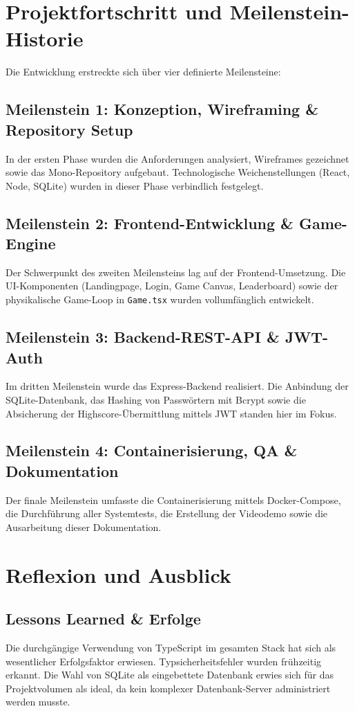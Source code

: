 \documentclass[12pt,a4paper]{article}
\begin{document}
\section{Projektfortschritt und Meilenstein-Historie}

Die Entwicklung erstreckte sich über vier definierte Meilensteine:

\subsection{Meilenstein 1: Konzeption, Wireframing \& Repository Setup}
In der ersten Phase wurden die Anforderungen analysiert, Wireframes gezeichnet sowie das Mono-Repository aufgebaut. Technologische Weichenstellungen (React, Node, SQLite) wurden in dieser Phase verbindlich festgelegt.

\subsection{Meilenstein 2: Frontend-Entwicklung \& Game-Engine}
Der Schwerpunkt des zweiten Meilensteins lag auf der Frontend-Umsetzung. Die UI-Komponenten (Landingpage, Login, Game Canvas, Leaderboard) sowie der physikalische Game-Loop in \texttt{Game.tsx} wurden vollumfänglich entwickelt.

\subsection{Meilenstein 3: Backend-REST-API \& JWT-Auth}
Im dritten Meilenstein wurde das Express-Backend realisiert. Die Anbindung der SQLite-Datenbank, das Hashing von Passwörtern mit Bcrypt sowie die Absicherung der Highscore-Übermittlung mittels JWT standen hier im Fokus.

\subsection{Meilenstein 4: Containerisierung, QA \& Dokumentation}
Der finale Meilenstein umfasste die Containerisierung mittels Docker-Compose, die Durchführung aller Systemtests, die Erstellung der Videodemo sowie die Ausarbeitung dieser Dokumentation.

\section{Reflexion und Ausblick}

\subsection{Lessons Learned \& Erfolge}
Die durchgängige Verwendung von TypeScript im gesamten Stack hat sich als wesentlicher Erfolgsfaktor erwiesen. Typsicherheitsfehler wurden frühzeitig erkannt. Die Wahl von SQLite als eingebettete Datenbank erwies sich für das Projektvolumen als ideal, da kein komplexer Datenbank-Server administriert werden musste.
\end{document}
